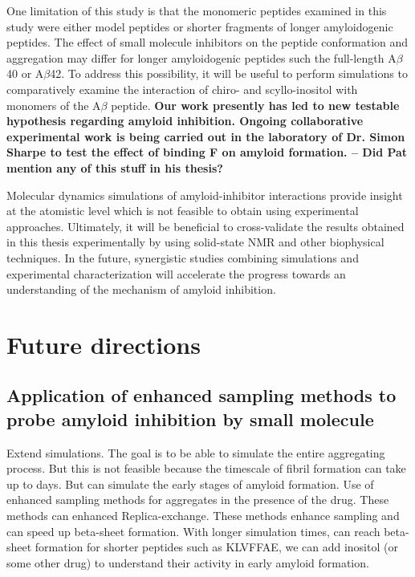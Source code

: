 One limitation of this study is that the monomeric peptides examined in this study were either model peptides or shorter fragments of longer amyloidogenic peptides. The effect of small molecule inhibitors on the peptide conformation and aggregation may differ for longer amyloidogenic peptides such the full-length A$\beta$40 or A$\beta$42. To address this possibility, it will be useful to perform simulations to comparatively examine the interaction of chiro- and scyllo-inositol with monomers of the A$\beta$ peptide.
\textbf{Our work presently has led to new testable hypothesis regarding amyloid inhibition. Ongoing collaborative experimental work is being carried out in the laboratory of Dr. Simon Sharpe to test the effect of binding F on amyloid formation. -- Did Pat mention any of this stuff in his thesis?}

Molecular dynamics simulations of amyloid-inhibitor interactions provide insight at the atomistic level which is not feasible to obtain using experimental approaches.  Ultimately, it will be beneficial to cross-validate the results obtained in this thesis experimentally by using solid-state NMR and other biophysical techniques. In the future, synergistic studies combining simulations and experimental characterization will accelerate the progress towards an understanding of the mechanism of amyloid inhibition.   

\section{Future directions}

\subsection{Application of enhanced sampling methods to probe amyloid inhibition by small molecule}
Extend simulations. The goal is to be able to simulate the entire aggregating process.  But this is not feasible because the timescale of fibril formation can take up to days. But can simulate the early stages of amyloid formation.  Use of enhanced sampling methods for aggregates in the presence of the drug.  These methods can enhanced Replica-exchange.  These methods enhance sampling and can speed up beta-sheet formation. With longer simulation times, can reach beta-sheet formation for shorter peptides such as KLVFFAE, we can add inositol (or some other drug) to understand their activity in early amyloid formation.

